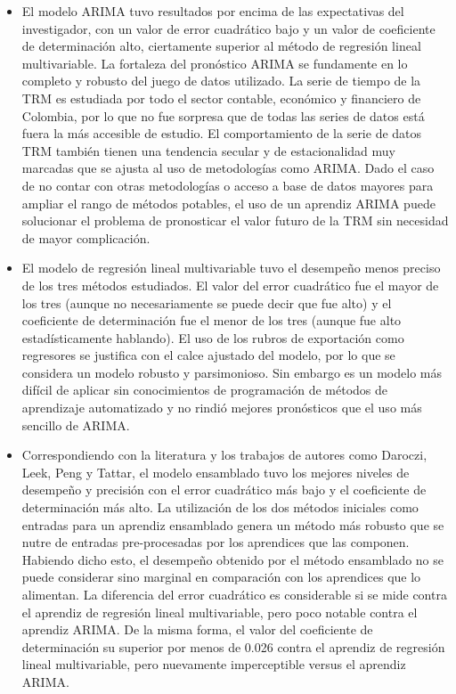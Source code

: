 \begin{itemize}
    \item El modelo ARIMA tuvo resultados por encima de las expectativas del investigador, con un valor de error cuadrático bajo y un valor de coeficiente de determinación alto, ciertamente superior al método de regresión lineal multivariable. La fortaleza del pronóstico ARIMA se fundamente en lo completo y robusto del juego de datos utilizado. La serie de tiempo de la TRM es estudiada por todo el sector contable, económico y financiero de Colombia, por lo que no fue sorpresa que de todas las series de datos está fuera la más accesible de estudio. El comportamiento de la serie de datos TRM también tienen una tendencia secular y de estacionalidad muy marcadas que se ajusta al uso de metodologías como ARIMA. Dado el caso de no contar con otras metodologías o acceso a base de datos mayores para ampliar el rango de métodos potables, el uso de un aprendiz ARIMA puede solucionar el problema de pronosticar el valor futuro de la TRM sin necesidad de mayor complicación.
    \item El modelo de regresión lineal multivariable tuvo el desempeño menos preciso de los tres métodos estudiados. El valor del error cuadrático fue el mayor de los tres (aunque no necesariamente se puede decir que fue alto) y el coeficiente de determinación fue el menor de los tres (aunque fue alto estadísticamente hablando). El uso de los rubros de exportación como regresores se justifica con el calce ajustado del modelo, por lo que se considera un modelo robusto y parsimonioso. Sin embargo es un modelo más difícil de aplicar sin conocimientos de programación de métodos de aprendizaje automatizado y no rindió mejores pronósticos que el uso más sencillo de ARIMA.
    \item Correspondiendo con la literatura y los trabajos de autores como Daroczi, Leek, Peng y Tattar, el modelo ensamblado tuvo los mejores niveles de desempeño y precisión con el error cuadrático más bajo y el coeficiente de determinación más alto. La utilización de los dos métodos iniciales como entradas para un aprendiz ensamblado genera un método más robusto que se nutre de entradas pre-procesadas por los aprendices que las componen. Habiendo dicho esto, el desempeño obtenido por el método ensamblado no se puede considerar sino marginal en comparación con los aprendices que lo alimentan. La diferencia del error cuadrático es considerable si se mide contra el aprendiz de regresión lineal multivariable, pero poco notable contra el aprendiz ARIMA. De la misma forma, el valor del coeficiente de determinación su superior por menos de 0.026 contra el aprendiz de regresión lineal multivariable, pero nuevamente imperceptible versus el aprendiz ARIMA.
\end{itemize}

